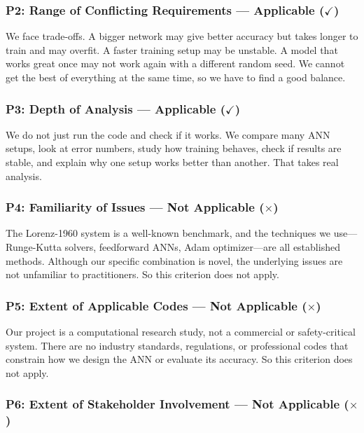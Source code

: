\subsubsection{P2: Range of Conflicting Requirements --- Applicable ($\checkmark$)}

We face trade-offs. A bigger network may give better accuracy but takes longer to train and may overfit. A faster training setup may be unstable. A model that works great once may not work again with a different random seed. We cannot get the best of everything at the same time, so we have to find a good balance.

\subsubsection{P3: Depth of Analysis --- Applicable ($\checkmark$)}

We do not just run the code and check if it works. We compare many ANN setups, look at error numbers, study how training behaves, check if results are stable, and explain why one setup works better than another. That takes real analysis.

\subsubsection{P4: Familiarity of Issues --- Not Applicable ($\times$)}

The Lorenz-1960 system is a well-known benchmark, and the techniques we use---Runge-Kutta solvers, feedforward ANNs, Adam optimizer---are all established methods. Although our specific combination is novel, the underlying issues are not unfamiliar to practitioners. So this criterion does not apply.

\subsubsection{P5: Extent of Applicable Codes --- Not Applicable ($\times$)}

Our project is a computational research study, not a commercial or safety-critical system. There are no industry standards, regulations, or professional codes that constrain how we design the ANN or evaluate its accuracy. So this criterion does not apply.

\subsubsection{P6: Extent of Stakeholder Involvement --- Not Applicable ($\times$)}

